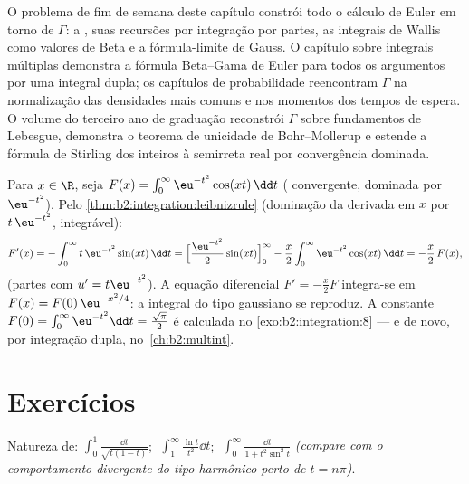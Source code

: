 \begin{remark}
O problema de fim de semana deste capítulo constrói todo o cálculo
de Euler em torno de $\Gamma$: a , suas recursões por
integração por partes, as integrais de Wallis como valores de Beta e a
fórmula-limite de Gauss. O capítulo sobre integrais múltiplas demonstra a
fórmula Beta--Gama de Euler para todos os argumentos por uma integral dupla; os
capítulos de probabilidade reencontram $\Gamma$ na normalização das
densidades mais comuns e nos momentos dos tempos de espera.
O volume do terceiro ano de graduação reconstrói $\Gamma$ sobre fundamentos de Lebesgue,
demonstra o teorema de unicidade de Bohr--Mollerup e estende
a fórmula de Stirling dos inteiros à semirreta real por
convergência dominada.
\end{remark}

\begin{example}\label{ex:b2:integration:laplace}
Para $x \in \R$, seja $F(x) = \int_0^{\infty} \eu^{-t^2}\cos(xt)\,\dd
t$ ( convergente, dominada por $\eu^{-t^2}$). Pelo
\cref{thm:b2:integration:leibnizrule} (dominação da
derivada em $x$ por $t\,\eu^{-t^2}$, integrável):
\[
F'(x) = -\int_0^\infty t\,\eu^{-t^2}\sin(xt)\,\dd t
= \Bigl[\frac{\eu^{-t^2}}{2}\sin(xt)\Bigr]_0^\infty
- \frac x2\int_0^\infty \eu^{-t^2}\cos(xt)\,\dd t
= -\frac x2\,F(x),
\]
(partes com $u' = t\eu^{-t^2}$). A equação diferencial $F' =
-\frac x2 F$ integra-se em $F(x) = F(0)\,\eu^{-x^2/4}$: a
integral do tipo gaussiano se reproduz. A constante $F(0) =
\int_0^\infty \eu^{-t^2}\dd t = \frac{\sqrt\pi}{2}$ é calculada no
\cref{exo:b2:integration:8} --- e de novo, por integração dupla,
no~\cref{ch:b2:multint}.
\end{example}

\section{Exercícios}

\begin{exercise}[$\star$]\label{exo:b2:integration:1}
Natureza de:
$\displaystyle\int_0^1 \frac{\dd t}{\sqrt{t(1-t)}}$;
$\;\displaystyle\int_1^\infty \frac{\ln t}{t^2}\dd t$;
$\;\displaystyle\int_0^\infty \frac{\dd t}{1 + t^2\sin^2 t}$
\emph{(compare com o comportamento divergente do tipo harmônico perto de $t =
n\pi$)}.
\end{exercise}

